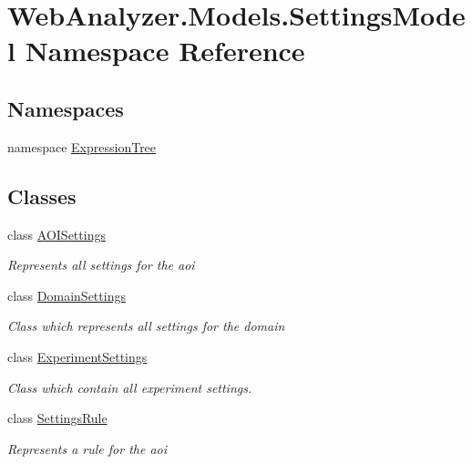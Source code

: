 \hypertarget{namespace_web_analyzer_1_1_models_1_1_settings_model}{}\section{Web\+Analyzer.\+Models.\+Settings\+Model Namespace Reference}
\label{namespace_web_analyzer_1_1_models_1_1_settings_model}
\subsection*{Namespaces}
\begin{DoxyCompactItemize}
\item 
namespace \hyperlink{namespace_web_analyzer_1_1_models_1_1_settings_model_1_1_expression_tree}{Expression\+Tree}
\end{DoxyCompactItemize}
\subsection*{Classes}
\begin{DoxyCompactItemize}
\item 
class \hyperlink{class_web_analyzer_1_1_models_1_1_settings_model_1_1_a_o_i_settings}{A\+O\+I\+Settings}
\begin{DoxyCompactList}\small\item\em Represents all settings for the aoi \end{DoxyCompactList}\item 
class \hyperlink{class_web_analyzer_1_1_models_1_1_settings_model_1_1_domain_settings}{Domain\+Settings}
\begin{DoxyCompactList}\small\item\em Class which represents all settings for the domain \end{DoxyCompactList}\item 
class \hyperlink{class_web_analyzer_1_1_models_1_1_settings_model_1_1_experiment_settings}{Experiment\+Settings}
\begin{DoxyCompactList}\small\item\em Class which contain all experiment settings. \end{DoxyCompactList}\item 
class \hyperlink{class_web_analyzer_1_1_models_1_1_settings_model_1_1_settings_rule}{Settings\+Rule}
\begin{DoxyCompactList}\small\item\em Represents a rule for the aoi \end{DoxyCompactList}\end{DoxyCompactItemize}

